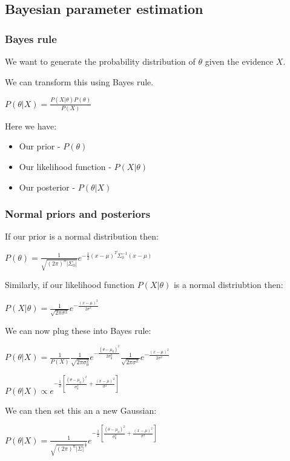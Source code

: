 
\subsection{Bayesian parameter estimation}

\subsubsection{Bayes rule}

We want to generate the probability distribution of \(\theta \) given the evidence \(X\).

We can transform this using Bayes rule.

\(P(\theta | X)=\frac{P(X|\theta )P(\theta )}{P(X)}\)

Here we have:

\begin{itemize}
\item Our prior - \(P(\theta )\)
\item Our likelihood function - \(P(X|\theta )\)
\item Our posterior - \(P(\theta | X)\)
\end{itemize}

\subsubsection{ Normal priors and posteriors}

If our prior is a normal distribution then:

\(P(\theta )=\frac{1}{\sqrt {(2\pi )^n|\Sigma_0|}}e^{-\frac{1}{2}(x-\mu )^T\Sigma_0^{-1}(x-\mu)}\)

Similarly, if our likelihood function \(P(X|\theta )\) is a normal distriubtion then:

\(P(X|\theta )=\frac{1}{\sqrt {2\pi \sigma^2}}e^{-\frac{(x-\mu)^2}{2\sigma ^2}}\)

We can now plug these into Bayes rule:

\(P(\theta |X)=\frac{1}{P(X)}\frac{1}{\sqrt {2\pi \sigma_0^2}}e^{-\frac{(\theta-\mu_0)^2}{2\sigma_0^2}}\frac{1}{\sqrt {2\pi \sigma^2}}e^{-\frac{(x-\mu)^2}{2\sigma ^2}}\)

\(P(\theta |X)\propto e^{-\frac{1}{2}[\frac{(\theta-\mu_0)^2}{\sigma_0^2}+\frac{(x-\mu)^2}{\sigma ^2}]}\)

We can then set this an a new Gaussian:

\(P(\theta |X)=\frac{1}{\sqrt {(2\pi )^{n}|\Sigma|}^{\frac{1}{2}}} e^{-\frac{1}{2}[\frac{(\theta-\mu_0)^2}{\sigma_0^2}+\frac{(x-\mu)^2}{\sigma ^2}]}\)

